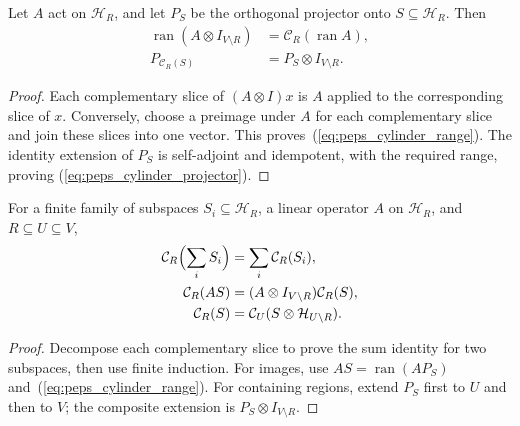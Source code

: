 \begin{lemma}
    \label{thm:peps_cylinder_projector}
    \leanok
    Let $A$ act on $\mathcal H_R$, and let $P_S$ be the orthogonal projector
    onto $S\subseteq\mathcal H_R$. Then
    \begin{align}
        \operatorname{ran}(A\otimes I_{V\setminus R})
                            & =\mathcal C_R(\operatorname{ran} A),
        \label{eq:peps_cylinder_range}                             \\
        P_{\mathcal C_R(S)} & =P_S\otimes I_{V\setminus R}.
        \label{eq:peps_cylinder_projector}
    \end{align}
\end{lemma}
\begin{proof}
    \leanok
    Each complementary slice of $(A\otimes I)x$ is $A$ applied to the
    corresponding slice of $x$. Conversely, choose a preimage under $A$ for
    each complementary slice and join these slices into one vector.
    This proves~(\ref{eq:peps_cylinder_range}). The identity extension of
    $P_S$ is self-adjoint and idempotent, with the required range, proving
    (\ref{eq:peps_cylinder_projector}).
\end{proof}

\begin{lemma}
    \label{thm:peps_cylinder_operations}
    \leanok
    For a finite family of subspaces $S_i\subseteq\mathcal H_R$, a linear
    operator $A$ on $\mathcal H_R$, and $R\subseteq U\subseteq V$,
    \begin{align}
        \mathcal C_R\Bigl(\sum_i S_i\Bigr) & =\sum_i\mathcal C_R(S_i),
        \label{eq:peps_cylinder_sum}                                                           \\
        \mathcal C_R(AS)                   & =(A\otimes I_{V\setminus R})\mathcal C_R(S),
        \label{eq:peps_cylinder_image}                                                         \\
        \mathcal C_R(S)                    & =\mathcal C_U(S\otimes\mathcal H_{U\setminus R}).
        \label{eq:peps_cylinder_containing}
    \end{align}
\end{lemma}
\begin{proof}
    \leanok
    Decompose each complementary slice to prove the sum identity for two
    subspaces, then use finite induction. For images, use
    $AS=\operatorname{ran}(AP_S)$ and~(\ref{eq:peps_cylinder_range}).
    For containing regions, extend $P_S$ first to $U$ and then to $V$;
    the composite extension is $P_S\otimes I_{V\setminus R}$.
\end{proof}

